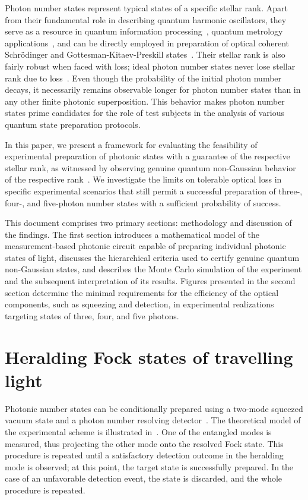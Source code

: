 \documentclass{article}
\begin{document}
Photon number states represent typical states of a specific stellar rank. Apart from their fundamental role in describing quantum harmonic oscillators, they serve as a resource in quantum information processing~\cite{marek2009}, quantum metrology applications~\cite{kunitski2019,oh2020}, and can be directly employed in preparation of optical coherent Schr\"{o}dinger and Gottesman-Kitaev-Preskill states~\cite{winnel2024}. Their stellar rank is also fairly robust when faced with loss; ideal photon number states never lose stellar rank due to loss~\cite{lachman2019}. Even though the probability of the initial photon number decays, it necessarily remains observable longer for photon number states than in any other finite photonic superposition. This behavior makes photon number states prime candidates for the role of test subjects in the analysis of various quantum state preparation protocols.

In this paper, we present a framework for evaluating the feasibility of experimental preparation of photonic states with a guarantee of the respective stellar rank, as witnessed by observing genuine quantum non-Gaussian behavior of the respective rank~\cite{lachman2019}. We investigate the limits on tolerable optical loss in specific experimental scenarios that still permit a successful preparation of three-, four-, and five-photon number states with a sufficient probability of success.
 
This document comprises two primary sections:  methodology and discussion of the findings. The first section introduces a mathematical model of the measurement-based photonic circuit capable of preparing individual photonic states of light, discusses the hierarchical criteria used to certify genuine quantum non-Gaussian states, and describes the Monte Carlo simulation of the experiment and the subsequent interpretation of its results. Figures presented in the second section determine the minimal requirements for the efficiency of the optical components, such as squeezing and detection, in experimental realizations targeting states of three, four, and five photons.

%

\section{Heralding Fock states of travelling light}

Photonic number states can be conditionally prepared using a two-mode squeezed vacuum state and a photon number resolving detector~\cite{yukawa2013a,yoshikawa2018,tiedau2019,provaznik2020}. The theoretical model of the experimental scheme is illustrated in~. One of the entangled modes is measured, thus projecting the other mode onto the resolved Fock state. This procedure is repeated until a satisfactory detection outcome in the heralding mode is observed; at this point, the target state is successfully prepared. In the case of an unfavorable detection event, the state is discarded, and the whole procedure is repeated.
\end{document}
